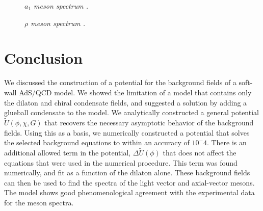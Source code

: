 \documentclass[12pt]{article}
\begin{document}
\begin{figure}[htb]
\caption{\textit{$a_1$ meson spectrum \cite{PDG}.}}
\end{figure}

\begin{figure}[htb]
\caption{\textit{$\rho$ meson spectrum \cite{PDG}.}}
\label{figRho}
\end{figure}

\section{Conclusion}

We discussed the construction of a potential for the background fields of a soft-wall AdS/QCD model. 
We showed the limitation of a model that contains only the dilaton and chiral condensate fields, and suggested a solution by adding a glueball condensate to the model.
We analytically constructed a general potential $\tilde{U}(\phi,\chi,G)$ that recovers the necessary asymptotic behavior of the background fields.
Using this as a basis, we numerically constructed a potential that solves the selected background equations to within an accuracy of $10^-4$. 
There is an additional allowed term in the  potential, $\Delta \tilde{U}(\phi)$ that does not affect the equations that were used in the numerical procedure. 
This term was found numerically, and fit as a function of the dilaton alone.
These background fields can then be used to find the spectra of the light vector and axial-vector mesons.
The model shows good phenomenological agreement with the experimental data for the meson spectra.
\end{document}
